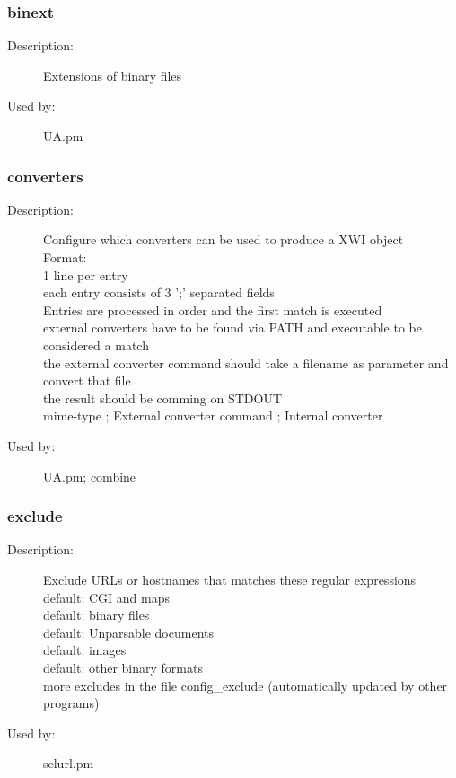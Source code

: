 \subsubsection{binext}
\label{binext}
\begin{description}
\item[Description:] Extensions of binary files
\item[Used by:] UA.pm
\end{description}
\subsubsection{converters}
\label{converters}
\begin{description}
\item[Description:] Configure which converters can be used to produce a XWI object \\ Format: \\   1 line per entry \\   each entry consists of 3 ';' separated fields \\ Entries are processed in order and the first match is executed \\   external converters have to be found via PATH and executable to be considered a match \\   the external converter command should take a filename as parameter and convert that file \\    the result should be comming on STDOUT \\  mime-type   ;   External converter command ; Internal converter
\item[Used by:] UA.pm; combine
\end{description}
\subsubsection{exclude}
\label{exclude}
\begin{description}
\item[Description:] Exclude URLs or hostnames that matches these regular expressions \\  default: CGI and maps \\  default: binary files \\  default: Unparsable documents \\  default: images \\  default: other binary formats \\ more excludes in the file config\_exclude (automatically updated by other programs)
\item[Used by:] selurl.pm
\end{description}
